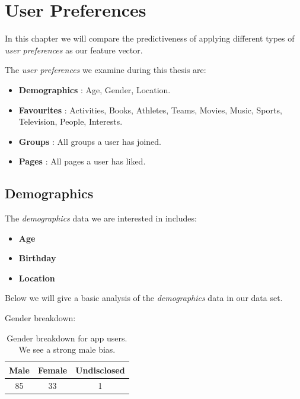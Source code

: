 
\chapter{User Preferences}
\label{cha:ivg}

In this chapter we will compare the predictiveness of applying different types of \emph{user preferences} as our feature vector.

The \emph{user preferences} we examine during this thesis are:
\begin{itemize}
\item \textbf{Demographics} : Age, Gender, Location.
\item \textbf{Favourites} : Activities, Books, Athletes, Teams, Movies, Music, Sports, Television, People, Interests.
\item \textbf{Groups} : All groups a user has joined.
\item \textbf{Pages} :  All pages a user has liked.
\end{itemize}

\section{Demographics}
\label{sec:demo}

The \emph{demographics} data we are interested in includes:
\begin{itemize}
\item \textbf{Age}
\item \textbf{Birthday}
\item \textbf{Location}
\end{itemize}

Below we will give a basic analysis of the \emph{demographics} data in our data set.

Gender breakdown:

\begin{table}[!htbp]
\centering
	\begin{tabular}{|c|c|c|} %
		\hline
		\textbf{Male} & \textbf{Female} & \textbf{Undisclosed}  \\ \hline
		85 & 33 & 1 \\ \hline
	\end{tabular}
	\caption{Gender breakdown for app users. We see a strong male bias.}
	\label{tab:revpol}
\end{table}

